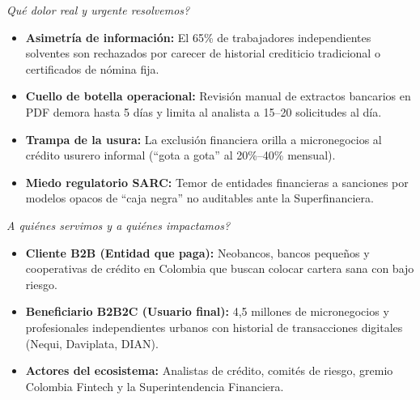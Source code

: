 \documentclass[11pt,a4paper]{article}
\begin{document}
\noindent
\begin{minipage}[t]{0.485\textwidth}
    \begin{tcolorbox}[colback=lightgray!50,colframe=primary,arc=2mm,title={\textbf{\small BLOQUE 1 (P1): PROBLEMA Y OPORTUNIDAD}},coltitle=white,fonttitle=\bfseries]
        \textit{\footnotesize \textquestiondown Qu\'e dolor real y urgente resolvemos?}\\[0.2cm]
        \begin{itemize}[leftmargin=*,noitemsep,topsep=2pt]
            \item \textbf{Asimetr\'ia de informaci\'on:} El 65\% de trabajadores independientes solventes son rechazados por carecer de historial crediticio tradicional o certificados de n\'omina fija.
            \item \textbf{Cuello de botella operacional:} Revisi\'on manual de extractos bancarios en PDF demora hasta 5 d\'ias y limita al analista a 15--20 solicitudes al d\'ia.
            \item \textbf{Trampa de la usura:} La exclusi\'on financiera orilla a micronegocios al cr\'edito usurero informal (``gota a gota'' al 20\%--40\% mensual).
            \item \textbf{Miedo regulatorio SARC:} Temor de entidades financieras a sanciones por modelos opacos de ``caja negra'' no auditables ante la Superfinanciera.
        \end{itemize}
    \end{tcolorbox}
\end{minipage}
\hfill
\begin{minipage}[t]{0.485\textwidth}
    \begin{tcolorbox}[colback=lightgray!50,colframe=primary,arc=2mm,title={\textbf{\small BLOQUE 2 (P1): SEGMENTOS DE ACTORES}},coltitle=white,fonttitle=\bfseries]
        \textit{\footnotesize \textquestiondown A qui\'enes servimos y a qui\'enes impactamos?}\\[0.2cm]
        \begin{itemize}[leftmargin=*,noitemsep,topsep=2pt]
            \item \textbf{Cliente B2B (Entidad que paga):} Neobancos, bancos peque\~nos y cooperativas de cr\'edito en Colombia que buscan colocar cartera sana con bajo riesgo.
            \item \textbf{Beneficiario B2B2C (Usuario final):} 4,5 millones de micronegocios y profesionales independientes urbanos con historial de transacciones digitales (Nequi, Daviplata, DIAN).
            \item \textbf{Actores del ecosistema:} Analistas de cr\'edito, comit\'es de riesgo, gremio Colombia Fintech y la Superintendencia Financiera.
        \end{itemize}
    \end{tcolorbox}
\end{minipage}
\end{document}
